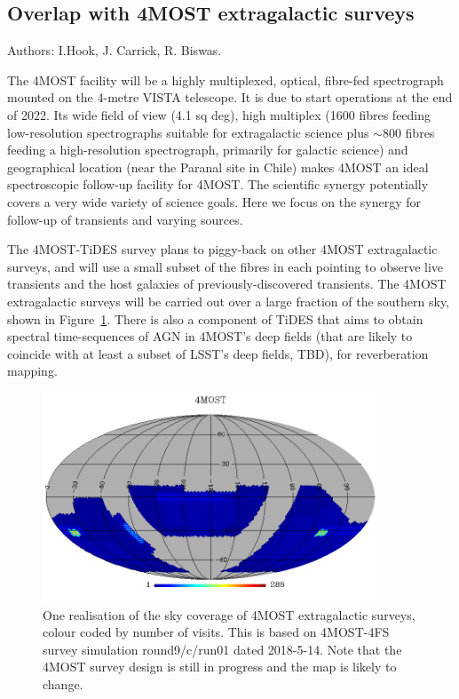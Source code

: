 \documentclass[a4paper,10pt]{article}
\begin{document}
\subsection{Overlap with 4MOST extragalactic surveys}

Authors: I.Hook, J. Carrick, R. Biswas.

\vspace{0.2cm}

The 4MOST facility will be a highly multiplexed, optical, fibre-fed
spectrograph mounted on the 4-metre VISTA telescope. It is due to
start operations at the end of 2022. Its wide field of view (4.1 sq
deg), high multiplex (1600 fibres feeding low-resolution spectrographs
suitable for extragalactic science plus $\sim 800$ fibres feeding a
high-resolution spectrograph, primarily for galactic science) and
geographical location (near the Paranal site in Chile) makes 4MOST an
ideal spectroscopic follow-up facility for 4MOST. The scientific
synergy potentially covers a very wide variety of science goals. Here
we focus on the synergy for follow-up of transients and varying
sources.

The 4MOST-TiDES survey plans to piggy-back on other 4MOST
extragalactic surveys, and will use a small subset of the fibres in
each pointing to observe live transients and the host galaxies of
previously-discovered transients. The 4MOST extragalactic surveys will
be carried out over a large fraction of the southern sky, shown in
Figure~\ref{4most_sky}.  There is also a component of TiDES that aims
to obtain spectral time-sequences of AGN in 4MOST's deep fields (that
are likely to coincide with at least a subset of LSST's deep fields,
TBD), for reverberation mapping.


\begin{figure}[hc]
\begin{centering}
  \includegraphics[width=10.0cm]{4most_fndep.png}
\end{centering}

\caption{One realisation of the sky coverage of 4MOST extragalactic
  surveys, colour coded by number of visits. This is based on
  4MOST-4FS survey simulation round9/c/run01 dated 2018-5-14. Note
  that the 4MOST survey design is still in progress and the map is
  likely to change.}
\label{4most_sky}
\end{figure}
\end{document}
